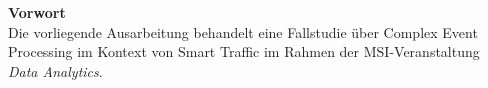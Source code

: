 \documentclass[paper,oneside,onecolumn,notitlepage,bibtotocnumbered,fontsize=12pt,bigheadings,ngerman]{scrartcl}
\newcommand{\sectionnumbering}[1]{%
  \setcounter{section}{0}%
  
   \renewcommand{\thesection}{\csname #1\endcsname{section}}}
\begin{document}


{\Large \textbf{Vorwort}}
\bigskip \\
Die vorliegende Ausarbeitung behandelt eine Fallstudie über Complex Event Processing im Kontext von Smart Traffic im Rahmen der MSI-Veranstaltung \textit{Data Analytics}.


\normalsize
\setlength{\parindent}{0pt}
\newpage
\sectionnumbering{Roman}
\setcounter{tocdepth}{2}
\tableofcontents

\clearpage
{} 
\sectionnumbering{arabic} 





%


\printbibliography 
\clearpage
\listoffigures 
\clearpage
\end{document}
